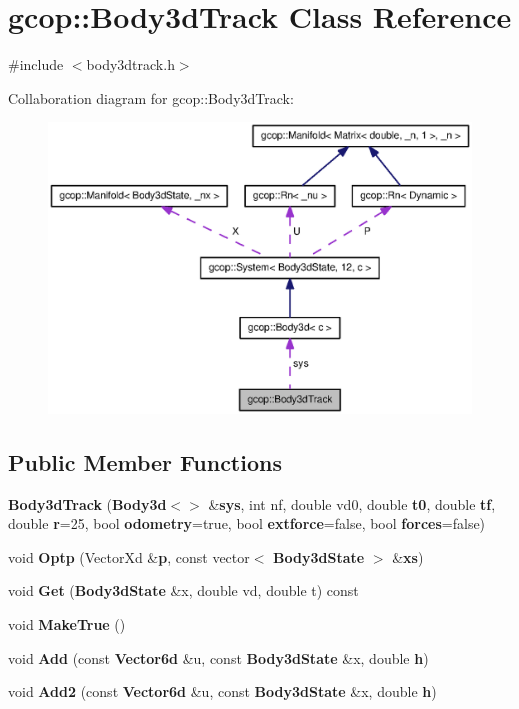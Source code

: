 \section{gcop\-:\-:\-Body3d\-Track \-Class \-Reference}
\label{classgcop_1_1Body3dTrack}


{\ttfamily \#include $<$body3dtrack.\-h$>$}



\-Collaboration diagram for gcop\-:\-:\-Body3d\-Track\-:
\nopagebreak
\begin{figure}[H]
\begin{center}
\leavevmode
\includegraphics[width=350pt]{classgcop_1_1Body3dTrack__coll__graph}
\end{center}
\end{figure}
\subsection*{\-Public \-Member \-Functions}
\begin{DoxyCompactItemize}
\item 
{\bf \-Body3d\-Track} ({\bf \-Body3d}$<$$>$ \&{\bf sys}, int nf, double vd0, double {\bf t0}, double {\bf tf}, double {\bf r}=25, bool {\bf odometry}=true, bool {\bf extforce}=false, bool {\bf forces}=false)
\item 
void {\bf \-Optp} (\-Vector\-Xd \&{\bf p}, const vector$<$ {\bf \-Body3d\-State} $>$ \&{\bf xs})
\item 
void {\bf \-Get} ({\bf \-Body3d\-State} \&x, double vd, double t) const 
\item 
void {\bf \-Make\-True} ()
\item 
void {\bf \-Add} (const {\bf \-Vector6d} \&u, const {\bf \-Body3d\-State} \&x, double {\bf h})
\item 
void {\bf \-Add2} (const {\bf \-Vector6d} \&u, const {\bf \-Body3d\-State} \&x, double {\bf h})
\end{DoxyCompactItemize}
